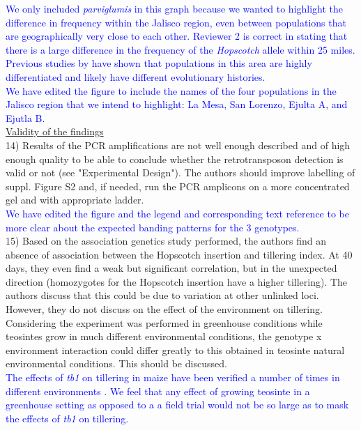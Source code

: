 \documentclass[11pt]{article}
\newcommand{\res}[1]{\noindent \textcolor{blue}{{#1}} \\}
\begin{document}
\res{We only included \emph{parviglumis} in this graph because we wanted to highlight the difference in frequency within the Jalisco region, even between populations that are geographically very close to each other. Reviewer 2 is correct in stating that there is a large difference in the frequency of the \emph{Hopscotch} allele within 25 miles. Previous studies by \citet{Hufford2010, Moeller01072007} have shown that populations in this area are highly differentiated and likely have different evolutionary histories.}

\res{We have edited the figure to include the names of the four populations in the Jalisco region that we intend to highlight: La Mesa, San Lorenzo, Ejulta A, and Ejutla B.}


\underline{Validity of the findings}\\

14) Results of the PCR amplifications are not well enough described and of high enough quality to be able to conclude whether the retrotransposon detection is valid or not (see "Experimental Design"). The authors should improve labelling of suppl. Figure S2 and, if needed, run the PCR amplicons on a more concentrated gel and with appropriate ladder.\\

\res{We have edited the figure and the legend and corresponding text reference to be more clear about the expected banding patterns for the 3 genotypes.}

15) Based on the association genetics study performed, the authors find an absence of association between the Hopscotch insertion and tillering index. At 40 days, they even find a weak but significant correlation, but in the unexpected direction (homozygotes for the Hopscotch insertion have a higher tillering). The authors discuss that this could be due to variation at other unlinked loci. However, they do not discuss on the effect of the environment on tillering. Considering the experiment was performed in greenhouse conditions while teosintes grow in much different environmental conditions, the genotype x environment interaction could differ greatly to this obtained in teosinte natural environmental conditions. This should be discussed.\\

\res{The effects of \emph{tb1} on tillering in maize have been verified a number of times in different environments \citet{Briggs2007, Clark2006, StuderDoebley2012, Studer2011}. We feel that any effect of growing teosinte in a greenhouse setting as opposed to a a field trial would not be so large as to mask the effects of \emph{tb1} on tillering.}



\end{document}
